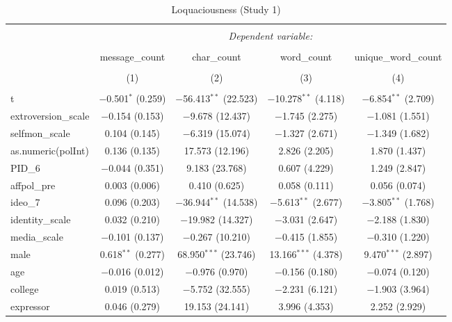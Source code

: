 
\begin{table}[H] \centering 
  \caption{Loquaciousness (Study 1)} 
  \label{tab:s1_loquaciousness} 
\begin{tabular}{@{\extracolsep{5pt}}lcccc} 
\\[-1.8ex]\hline 
\hline \\[-1.8ex] 
 & \multicolumn{4}{c}{\textit{Dependent variable:}} \\ 
\cline{2-5} 
\\[-1.8ex] & message\_count & char\_count & word\_count & unique\_word\_count \\ 
\\[-1.8ex] & (1) & (2) & (3) & (4)\\ 
\hline \\[-1.8ex] 
 t & $-$0.501$^{*}$ (0.259) & $-$56.413$^{**}$ (22.523) & $-$10.278$^{**}$ (4.118) & $-$6.854$^{**}$ (2.709) \\ 
  extroversion\_scale & $-$0.154 (0.153) & $-$9.678 (12.437) & $-$1.745 (2.275) & $-$1.081 (1.551) \\ 
  selfmon\_scale & 0.104 (0.145) & $-$6.319 (15.074) & $-$1.327 (2.671) & $-$1.349 (1.682) \\ 
  as.numeric(polInt) & 0.136 (0.135) & 17.573 (12.196) & 2.826 (2.205) & 1.870 (1.437) \\ 
  PID\_6 & $-$0.044 (0.351) & 9.183 (23.768) & 0.607 (4.229) & 1.249 (2.847) \\ 
  affpol\_pre & 0.003 (0.006) & 0.410 (0.625) & 0.058 (0.111) & 0.056 (0.074) \\ 
  ideo\_7 & 0.096 (0.203) & $-$36.944$^{**}$ (14.538) & $-$5.613$^{**}$ (2.677) & $-$3.805$^{**}$ (1.768) \\ 
  identity\_scale & 0.032 (0.210) & $-$19.982 (14.327) & $-$3.031 (2.647) & $-$2.188 (1.830) \\ 
  media\_scale & $-$0.101 (0.137) & $-$0.267 (10.210) & $-$0.415 (1.855) & $-$0.310 (1.220) \\ 
  male & 0.618$^{**}$ (0.277) & 68.950$^{***}$ (23.746) & 13.166$^{***}$ (4.378) & 9.470$^{***}$ (2.897) \\ 
  age & $-$0.016 (0.012) & $-$0.976 (0.970) & $-$0.156 (0.180) & $-$0.074 (0.120) \\ 
  college & 0.019 (0.513) & $-$5.752 (32.555) & $-$2.231 (6.121) & $-$1.903 (3.964) \\ 
  expressor & 0.046 (0.279) & 19.153 (24.141) & 3.996 (4.353) & 2.252 (2.929) \\ 

\end{tabular}
\end{table}
